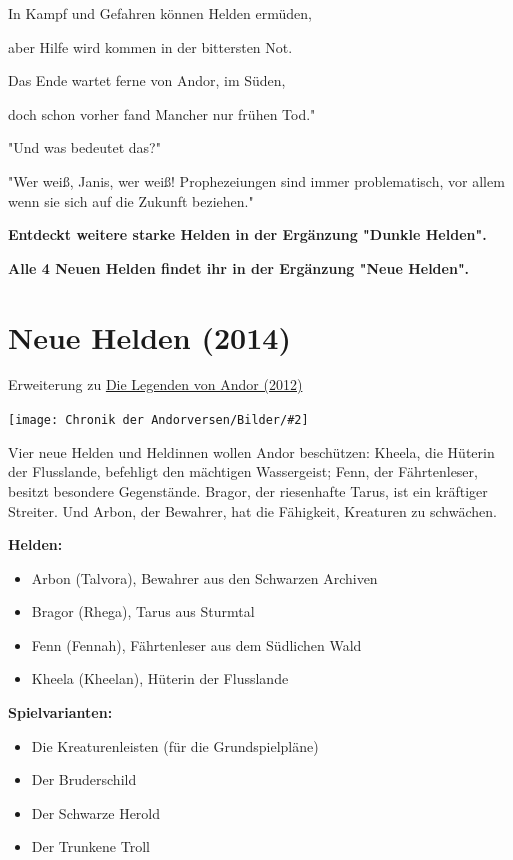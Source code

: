 \documentclass[10pt, a4paper, oneside]{book}
\newcommand{\fillbreak}{\vspace*{\fill}\columnbreak}
\newcommand{\produkt}[1]{%
    \section{#1}%
    \label{Produkt: #1}%
}
\newcommand{\refprodukt}[1]{\hyperref[Produkt: #1]{#1}}
\newcommand{\bildmitts}[2][height=0.32\textwidth,width=0.48\textwidth,keepaspectratio]{%
    \begin{center}
        \texttt{[image: Chronik der Andorversen/Bilder/\#2]}
    \end{center}
}
\begin{document}
\begin{multicols}{2}
In Kampf und Gefahren können Helden ermüden,

aber Hilfe wird kommen in der bittersten Not.

Das Ende wartet ferne von Andor, im Süden,

doch schon vorher fand Mancher nur frühen Tod."

"Und was bedeutet das?"

"Wer weiß, Janis, wer weiß! Prophezeiungen sind immer problematisch, vor 
allem wenn sie sich auf die Zukunft beziehen." \bigskip

\textbf{Entdeckt weitere starke Helden in der Ergänzung "Dunkle Helden".} 

\textbf{Alle 4 Neuen Helden findet ihr in der Ergänzung "Neue Helden".} 



\fillbreak
\produkt{Neue Helden (2014)}

\begin{center}
    Erweiterung zu \refprodukt{Die Legenden von Andor (2012)}
\end{center}

\bildmitts{Neue Helden (2014).png}

Vier neue Helden und Heldinnen wollen Andor beschützen: Kheela, die Hüterin der Flusslande, befehligt den mächtigen Wassergeist; Fenn, der Fährtenleser, besitzt besondere Gegenstände. Bragor, der riesenhafte Tarus, ist ein kräftiger Streiter. Und Arbon, der Bewahrer, hat die Fähigkeit, Kreaturen zu schwächen.\bigskip

\textbf{Helden:}

\begin{itemize}[topsep=0pt,itemsep=-1ex,partopsep=1ex,parsep=1ex]
    \item Arbon (Talvora), Bewahrer aus den Schwarzen Archiven
    \item Bragor (Rhega), Tarus aus Sturmtal
    \item Fenn (Fennah), Fährtenleser aus dem Südlichen Wald
    \item Kheela (Kheelan), Hüterin der Flusslande
\end{itemize}



\textbf{Spielvarianten:} 

\begin{itemize}[topsep=0pt,itemsep=-1ex,partopsep=1ex,parsep=1ex]
    \item Die Kreaturenleisten (für die Grundspielpläne)
    \item Der Bruderschild
    \item Der Schwarze Herold
    \item Der Trunkene Troll
\end{itemize}



\end{multicols}
\end{document}
